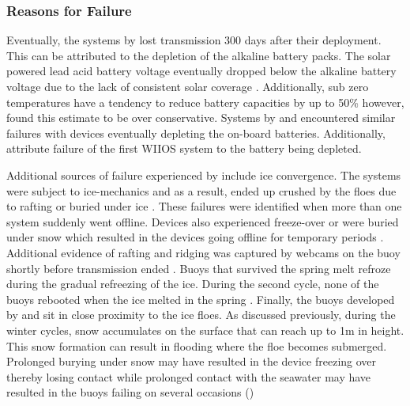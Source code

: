 \subsubsection{Reasons for Failure}
\label{ch2:sec3_failiure}

Eventually, the systems by \textcite{doble2017robust} lost transmission 300 days after their deployment. This can be attributed to the depletion of the alkaline battery packs. The solar powered lead acid battery voltage eventually dropped below the alkaline battery voltage due to the lack of consistent solar coverage \cite{doble2017robust}. Additionally, sub zero temperatures have a tendency to reduce battery capacities by up to 50\% \cite{doble2017robust} however, \textcite{doble2017robust} found this estimate to be over conservative. Systems by \textcite{kohout2015device} and \textcite{doble2017robust} encountered similar failures with devices eventually depleting the on-board batteries. Additionally, \cite{vichi2019effects,alberello2019drift} attribute failure of the first WIIOS system to the battery being depleted.\par 

Additional sources of failure experienced by \textcite{doble2017robust} include ice convergence. The systems were subject to ice-mechanics and as a result, ended up crushed by the floes due to rafting or buried under ice \textcite{doble2017robust}. These failures were identified when more than one system suddenly went offline. Devices also experienced freeze-over or were buried under snow which resulted in the devices going offline for temporary periods \cite{doble2017robust}. Additional evidence of rafting and ridging was captured by webcams on the buoy shortly before transmission ended \cite{doble2017robust}. Buoys that survived the spring melt refroze during the gradual refreezing of the ice. During the second cycle, none of the buoys rebooted when the ice melted in the spring \cite{doble2017robust}. Finally, the buoys developed by \textcite{kohout2015device} and \textcite{rabault2017measurements} sit in close proximity to the ice floes. As discussed previously, during the winter cycles, snow accumulates on the surface that can reach up to 1m in height. This snow formation can result in flooding where the floe becomes submerged. Prolonged burying under snow may have resulted in the device freezing over thereby losing contact while prolonged contact with the seawater may have resulted in the buoys failing on several occasions (\cite{kohout2015device,vichi2019effects,albarello2020drift,rabault2019open})\par 

